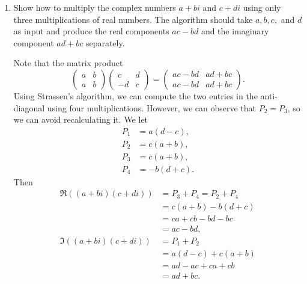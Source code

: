\documentclass[Chapter04]{subfiles}
\begin{document}
\begin{enumerate}
		\item Show how to multiply the complex numbers $a + bi$ and $c + di$ using only three multiplications of real numbers. The algorithm should take $a, b, c,$ and $d$ as input and produce the real components $ac-bd$ and the imaginary component $ad+bc$ separately.
		\begin{answer}
			Note that the matrix product
			\[
				\begin{pmatrix}
					a & b\\
					a & b
				\end{pmatrix}
				\begin{pmatrix}
					c & d\\
					-d & c
				\end{pmatrix}
				=
				\begin{pmatrix}
					ac-bd & ad + bc\\
					ac-bd & ad + bc
				\end{pmatrix}
				.
			\]
			Using Strassen's algorithm, we can compute the two entries in the anti-diagonal using four multiplications. However, we can observe that $P_2 = P_3$, so we can avoid recalculating it. We let
			\begin{align*}
				P_1 &= a(d - c),\\
				P_2 &= c(a + b),\\
				P_3 &= c(a + b),\\
				P_4 &= -b(d + c).
			\end{align*}
			Then
			\begin{align*}
				\Re((a + bi)(c + di)) &= P_3 + P_4 = P_2 + P_4\\
					&= c(a + b) - b(d + c)\\
					&= ca + cb - bd -bc\\
					&= ac - bd,\\
				\Im((a + bi)(c + di)) &= P_1 + P_2\\
					&= a(d - c) + c(a + b)\\
					&= ad - ac + ca + cb\\
					&= ad + bc.
			\end{align*}
		\end{answer}

	\end{enumerate}
\end{document}
